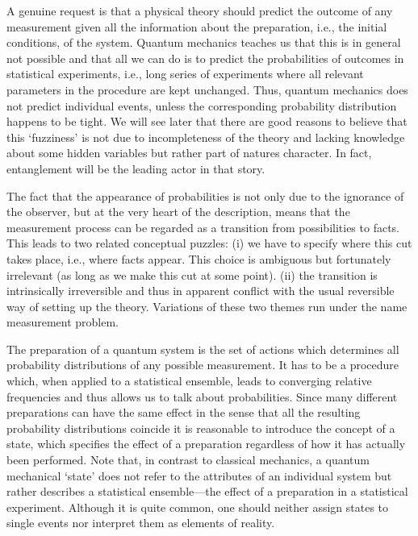 \documentclass[11pt,a4paper]{article}
\theoremstyle{plain}
\theoremstyle{definition}
\theoremstyle{remark}
\numberwithin{equation}{section}
\begin{document}
A genuine request is that a physical theory should predict the outcome of any measurement given all the information about the preparation, i.e., the initial conditions, of the system. Quantum mechanics teaches us that this is in general not possible and that all we can do is to predict the probabilities of outcomes in statistical experiments, i.e., long series of experiments where all relevant parameters in the procedure are kept unchanged. Thus, quantum mechanics does not predict individual events, unless the corresponding probability distribution happens to be tight. We will see later that there are good reasons to believe that this `fuzziness' is not due to incompleteness of the theory and lacking knowledge about some hidden variables but rather part of natures character. In fact, entanglement will be the leading actor in that story.

The fact that the appearance of probabilities is not only due to the ignorance of the observer, but at the very heart of the description, means that the measurement process can be regarded as a transition from possibilities to facts. This leads to two related conceptual puzzles: (i) we have to specify where this cut takes place, i.e., where facts appear. This choice is ambiguous but fortunately irrelevant (as long as we make this cut at some point). (ii) the transition is intrinsically irreversible and thus in apparent conflict with the usual reversible way of setting up the theory. Variations of these two themes run under the name measurement problem.

The preparation of a quantum system is the set of actions which determines all probability distributions of any possible measurement. It has to be a procedure which, when applied to a statistical ensemble, leads to converging relative frequencies and thus allows us to talk about probabilities. Since many different preparations can have the same effect in the sense that all the resulting probability distributions coincide it is reasonable to introduce the concept of a state, which specifies the effect of a preparation regardless of how it has actually been performed. Note that, in contrast to classical mechanics, a quantum mechanical `state' does not refer to the attributes of an individual system but rather describes a statistical ensemble---the effect of a preparation in a statistical experiment. Although it is quite common, one should neither assign states to single events nor interpret them as elements of reality.
\end{document}
